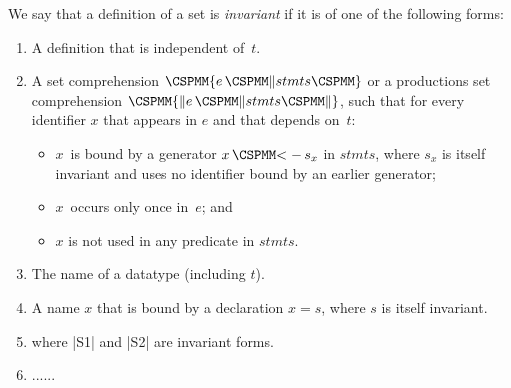 


\begin{definition}
\label{def:invariant}
We say that a definition of a set is \emph{invariant} if it is of one of the
following forms:
%
\begin{enumerate}
\item A definition that is independent of~$t$.

\item A set comprehension $\M\{ e \,\M\| stmts \M\}$ or a productions set
comprehension $\M{\{\|} e \,\M\| stmts \M{\|\}}$, such that for every identifier
$x$ that appears in $e$ and that depends on~$t$:
  \begin{itemize}
  \item $x$~is bound by a generator $x \,\M{<-}\, s_x$ in $stmts$, where $s_x$ is
  itself invariant and uses no identifier bound by an earlier generator;
  \item $x$~occurs only once in~$e$; and
  \item $x$ is not used in any predicate in $stmts$.
  \end{itemize}

\item The name of a datatype (including $t$). 

\item A name $x$ that is bound by a declaration $x = s$, where $s$ is itself
invariant. 

\item {} where |S1| and |S2| are invariant forms. 

\item ......
\end{enumerate}
\end{definition}

